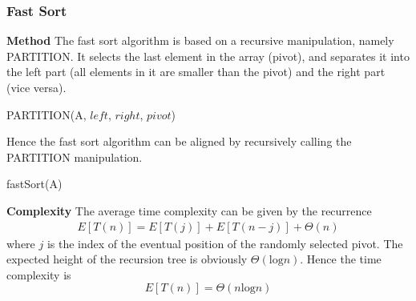 \documentclass[11pt]{article}
\begin{document}
\subsubsection{Fast Sort}
\noindent \textbf{Method} The fast sort algorithm is based on a recursive manipulation, namely PARTITION. It selects the last element in the array (pivot), and separates it into the left part (all elements in it are smaller than the pivot) and the right part (vice versa).\par \noindent 
\begin{algorithm}
    \caption{PARTITION(A, $left$, $right$, $pivot$)}
    \label{part}
    \begin{algorithmic}
        \ELSE
        \ENDIF
        \ENDFOR
        \ENDIF
    \end{algorithmic}
\end{algorithm} \par \noindent
Hence the fast sort algorithm can be aligned by recursively calling the PARTITION manipulation.
\begin{algorithm}
    \caption{fastSort(A)}
    \label{faSort}
    \begin{algorithmic}
    \end{algorithmic}
\end{algorithm} \par \noindent
\textbf{Complexity}
The average time complexity can be given by the recurrence
\begin{equation}
\begin{aligned}
    E[T(n)] = E[T(j)] + E[T(n-j)] + \Theta(n)
\end{aligned}
\end{equation}
where $j$ is the index of the eventual position of the randomly selected pivot. The expected height of the recursion tree is obviously $\Theta(\text{log}n)$. Hence the time complexity is
\begin{equation}
    E[T(n)] = \Theta(n\text{log}n)
\end{equation}
\end{document}
